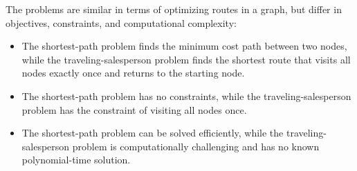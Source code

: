 The problems are similar in terms of optimizing routes in a graph, but differ in objectives, constraints, and computational complexity:
\begin{itemize}
    \item The shortest-path problem finds the minimum cost path between two nodes, while the traveling-salesperson problem finds the shortest route that visits all nodes exactly once and returns to the starting node.
    \item The shortest-path problem has no constraints, while the traveling-salesperson problem has the constraint of visiting all nodes once.
    \item The shortest-path problem can be solved efficiently, while the traveling-salesperson problem is computationally challenging and has no known polynomial-time solution.
\end{itemize}
